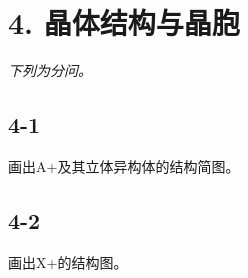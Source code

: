 \section*{4. 晶体结构与晶胞}
\textit{下列为分问。}

\subsection*{4-1}
画出A+及其⽴体异构体的结构简图。

\subsection*{4-2}
画出X+的结构图。
